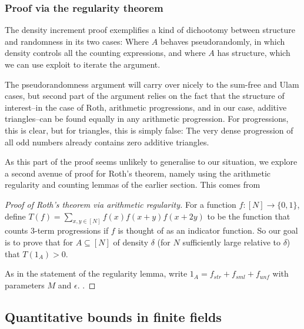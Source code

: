 \documentclass{article}
\theoremstyle{definition}
\theoremstyle{remark}
\numberwithin{equation}{section}
\begin{document}
{\color{red}

\subsubsection{Proof via the regularity theorem}

The density increment proof exemplifies a kind of dichootomy between
structure and randomness in its two cases: Where $A$ behaves
pseudorandomly, in which density controls all the counting
expressions, and where $A$ has structure, which we can use exploit to
iterate the argument.

The pseudorandomness argument will carry over nicely to the sum-free
and Ulam cases, but second part of the argument relies on the fact
that the structure of interest--in the case of Roth, arithmetic
progressions, and in our case, additive triangles--can be found
equally in any arithmetic progression.  For progressions, this is
clear, but for triangles, this is simply false: The very dense
progression of all odd numbers already contains zero additive
triangles.  

As this part of the proof seems unlikely to generalise to our
situation, we explore a second avenue of proof for Roth's theorem,
namely using the arithmetic regularity and counting lemmas of the
earlier section.  This comes from \cite{tao:ams2012}

\begin{proof}[Proof of Roth's theorem via arithmetic regularity]
  For a function $f : [N] \to \{0,1\}$, define
  $T(f) = \sum_{x,y \in [N]} f(x)f(x+y)f(x+2y)$ to be the function
  that counts 3-term progressions if $f$ is thought of as an indicator
  function.  So our goal is to prove that for $A \subseteq [N]$ of
  density $\delta$ (for $N$ sufficiently large relative to $\delta$)
  that $T(1_A) > 0$.  
  
  As in the statement of the regularity lemma, write
  $1_A = f_{str} + f_{sml} + f_{unf}$ with parameters $M$ and
  $\epsilon$.  .
\end{proof}

}
\subsection{Quantitative bounds in finite fields}
\end{document}

